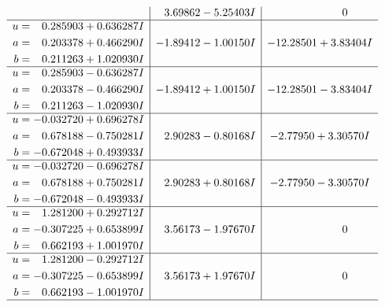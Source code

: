 \documentclass[1p]{elsarticle_modified}
\theoremstyle{definition}
\begin{document}
$$\begin{array}{c|c|c}
 & \phantom{-}3.69862 - 5.25403 I & \phantom{-0.000000 } 0 \\ \hline\begin{aligned}
u &= \phantom{-}0.285903 + 0.636287 I \\
a &= \phantom{-}0.203378 + 0.466290 I \\
b &= \phantom{-}0.211263 + 1.020930 I\end{aligned}
 & -1.89412 - 1.00150 I & -12.28501 + 3.83404 I \\ \hline\begin{aligned}
u &= \phantom{-}0.285903 - 0.636287 I \\
a &= \phantom{-}0.203378 - 0.466290 I \\
b &= \phantom{-}0.211263 - 1.020930 I\end{aligned}
 & -1.89412 + 1.00150 I & -12.28501 - 3.83404 I \\ \hline\begin{aligned}
u &= -0.032720 + 0.696278 I \\
a &= \phantom{-}0.678188 - 0.750281 I \\
b &= -0.672048 + 0.493933 I\end{aligned}
 & \phantom{-}2.90283 - 0.80168 I & -2.77950 + 3.30570 I \\ \hline\begin{aligned}
u &= -0.032720 - 0.696278 I \\
a &= \phantom{-}0.678188 + 0.750281 I \\
b &= -0.672048 - 0.493933 I\end{aligned}
 & \phantom{-}2.90283 + 0.80168 I & -2.77950 - 3.30570 I \\ \hline\begin{aligned}
u &= \phantom{-}1.281200 + 0.292712 I \\
a &= -0.307225 + 0.653899 I \\
b &= \phantom{-}0.662193 + 1.001970 I\end{aligned}
 & \phantom{-}3.56173 - 1.97670 I & \phantom{-0.000000 } 0 \\ \hline\begin{aligned}
u &= \phantom{-}1.281200 - 0.292712 I \\
a &= -0.307225 - 0.653899 I \\
b &= \phantom{-}0.662193 - 1.001970 I\end{aligned}
 & \phantom{-}3.56173 + 1.97670 I & \phantom{-0.000000 } 0\\
 \hline 
 \end{array}$$\newpage$$\begin{array}{c|c|c}  

\end{array}$$
\end{document}
